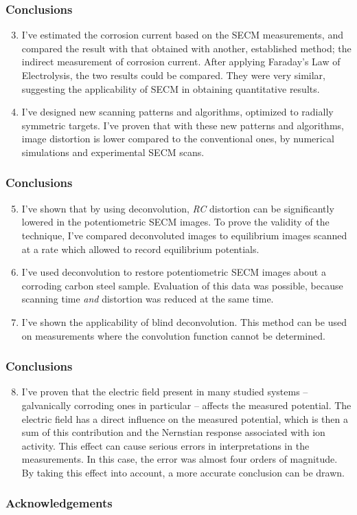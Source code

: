 \documentclass{beamer}
\begin{document}
\begin{frame}
\frametitle{Conclusions}
\begin{enumerate}
\setcounter{enumi}{2}
\item I've estimated the corrosion current based on the SECM measurements, and compared the result with that obtained with another, established method; the indirect measurement of corrosion current.
After applying Faraday's Law of Electrolysis, the two results could be compared.
They were very similar, suggesting the applicability of SECM in obtaining quantitative results.

\item I've designed new scanning patterns and algorithms, optimized to radially symmetric targets.
I've proven that with these new patterns and algorithms, image distortion is lower compared to the conventional ones, by numerical simulations and experimental SECM scans.
\end{enumerate}
\end{frame}

\begin{frame}
\frametitle{Conclusions}
\begin{enumerate}
\setcounter{enumi}{4}
\item I've shown that by using deconvolution, \emph{RC} distortion can be significantly lowered in the potentiometric SECM images.
To prove the validity of the technique, I've compared deconvoluted images to equilibrium images scanned at a rate which allowed to record equilibrium potentials.

\item I've used deconvolution to restore potentiometric SECM images about a corroding carbon steel sample.
Evaluation of this data was possible, because scanning time \emph{and} distortion was reduced at the same time.

\item I've shown the applicability of blind deconvolution.
This method can be used on measurements where the convolution function cannot be determined.
\end{enumerate}
\end{frame}

\begin{frame}
\frametitle{Conclusions}
\begin{enumerate}
\setcounter{enumi}{7}
\item I've proven that the electric field present in many studied systems -- galvanically corroding ones in particular -- affects the measured potential.
The electric field has a direct influence on the measured potential, which is then a sum of this contribution and the Nernstian response associated with ion activity.
This effect can cause serious errors in interpretations in the measurements.
In this case, the error was almost four orders of magnitude.
By taking this effect into account, a more accurate conclusion can be drawn.
\end{enumerate}
\end{frame}

\begin{frame}
	\frametitle{Acknowledgements}
\end{frame}
\end{document}
